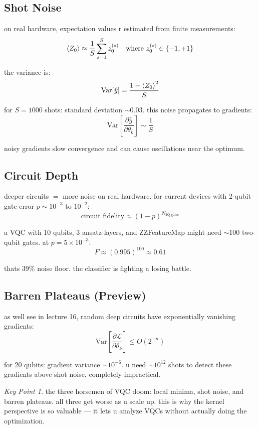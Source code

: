 \documentclass[11pt,a4paper]{article}
\theoremstyle{definition}
\theoremstyle{remark}
\newtheorem*{keypoint}{Key Point}
\begin{document}
\subsection{Shot Noise}

on real hardware, expectation values r estimated from finite measurements:
\[
\braket{Z_0} \approx \frac{1}{S}\sum_{s=1}^S z_0^{(s)} \quad \text{where } z_0^{(s)} \in \{-1, +1\}
\]

the variance is:
\[
\text{Var}[\hat{y}] = \frac{1 - \braket{Z_0}^2}{S}
\]

for $S = 1000$ shots: standard deviation $\sim 0.03$. this noise propagates to gradients:
\[
\text{Var}\left[\frac{\partial \hat{y}}{\partial \theta_k}\right] \sim \frac{1}{S}
\]

noisy gradients slow convergence and can cause oscillations near the optimum.

\subsection{Circuit Depth}

deeper circuits $=$ more noise on real hardware. for current devices with 2-qubit gate error $p \sim 10^{-3}$ to $10^{-2}$:
\[
\text{circuit fidelity} \approx (1-p)^{N_{\text{2Q gates}}}
\]

a VQC with 10 qubits, 3 ansatz layers, and ZZFeatureMap might need $\sim 100$ two-qubit gates. at $p = 5 \times 10^{-3}$:
\[
F \approx (0.995)^{100} \approx 0.61
\]

thats 39\% noise floor. the classifier is fighting a losing battle.

\subsection{Barren Plateaus (Preview)}

as well see in lecture 16, random deep circuits have exponentially vanishing gradients:
\[
\text{Var}\left[\frac{\partial \mathcal{L}}{\partial \theta_k}\right] \leq O(2^{-n})
\]

for 20 qubits: gradient variance $\sim 10^{-6}$. u need $\sim 10^{12}$ shots to detect these gradients above shot noise. completely impractical.

\begin{keypoint}
the three horsemen of VQC doom: local minima, shot noise, and barren plateaus. all three get worse as u scale up. this is why the kernel perspective is so valuable --- it lets u analyze VQCs without actually doing the optimization.
\end{keypoint}
\end{document}
